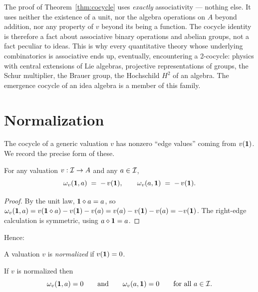 \begin{remark}
The proof of Theorem~\ref{thm:cocycle} uses \emph{exactly} associativity ---
nothing else. It uses neither the existence of a unit, nor the algebra
operations on $A$ beyond addition, nor any property of $v$ beyond its being
a function. The cocycle identity is therefore a fact about associative
binary operations and abelian groups, not a fact peculiar to ideas. This is
why every quantitative theory whose underlying combinatorics is associative
ends up, eventually, encountering a 2-cocycle: physics with central
extensions of Lie algebras, projective representations of groups, the
Schur multiplier, the Brauer group, the Hochschild $H^2$ of an algebra. The
emergence cocycle of an idea algebra is a member of this family.
\end{remark}

\section{Normalization}\label{sec:normalization}

The cocycle of a generic valuation $v$ has nonzero ``edge values'' coming
from $v(\mathbf{1})$. We record the precise form of these.

\begin{lemma}\label{lem:edge}
For any valuation $v : \mathcal{I} \to A$ and any $a \in \mathcal{I}$,
\[
  \omega_v(\mathbf{1}, a) \;=\; -\,v(\mathbf{1}), \qquad
  \omega_v(a, \mathbf{1}) \;=\; -\,v(\mathbf{1}).
\]
\end{lemma}

\begin{proof}
By the unit law, $\mathbf{1}\mathbin{\diamond} a = a$, so $\omega_v(\mathbf{1}, a) = v(\mathbf{1}
\mathbin{\diamond} a) - v(\mathbf{1}) - v(a) = v(a) - v(\mathbf{1}) - v(a) = -v(\mathbf{1})$. The
right-edge calculation is symmetric, using $a\mathbin{\diamond} \mathbf{1} = a$.
\end{proof}

Hence:

\begin{definition}
A valuation $v$ is \emph{normalized} if $v(\mathbf{1}) = 0$.
\end{definition}

\begin{corollary}\label{cor:normalized-omega}
If $v$ is normalized then
\[
  \omega_v(\mathbf{1}, a) = 0 \qquad\text{and}\qquad \omega_v(a,\mathbf{1}) = 0
  \qquad\text{for all } a\in\mathcal{I}.
\]
\end{corollary}

